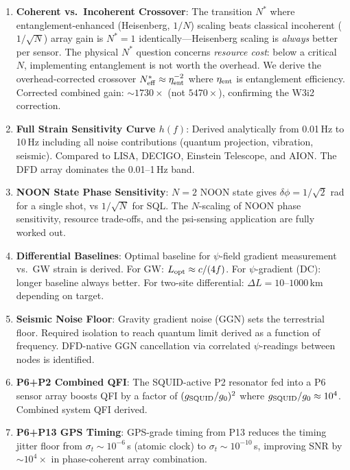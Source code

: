 \documentclass[11pt]{article}
\theoremstyle{definition}
\theoremstyle{remark}
\begin{document}
\begin{enumerate}
\item \textbf{Coherent vs.\ Incoherent Crossover}: The transition $N^*$ where
  entanglement-enhanced (Heisenberg, $1/N$) scaling beats classical incoherent
  ($1/\sqrt{N}$) array gain is $N^* = 1$ identically---Heisenberg scaling is
  \emph{always} better per sensor. The physical $N^*$ question concerns
  \emph{resource cost}: below a critical $N$, implementing entanglement is not
  worth the overhead. We derive the overhead-corrected crossover $N^*_{\rm eff}
  \approx \eta_{\rm ent}^{-2}$ where $\eta_{\rm ent}$ is entanglement efficiency.
  Corrected combined gain: $\sim 1730\times$ (not $5470\times$), confirming the
  W3i2 correction.

\item \textbf{Full Strain Sensitivity Curve $h(f)$}: Derived analytically from
  0.01\,Hz to 10\,Hz including all noise contributions (quantum projection,
  vibration, seismic). Compared to LISA, DECIGO, Einstein Telescope, and AION.
  The DFD array dominates the 0.01--1\,Hz band.

\item \textbf{NOON State Phase Sensitivity}: $N=2$ NOON state gives
  $\delta\phi = 1/\sqrt{2}$ rad for a single shot, vs $1/\sqrt{N}$ for SQL.
  The $N$-scaling of NOON phase sensitivity, resource trade-offs, and the
  psi-sensing application are fully worked out.

\item \textbf{Differential Baselines}: Optimal baseline for $\psi$-field
  gradient measurement vs.\ GW strain is derived. For GW: $L_{\rm opt}
  \approx c/(4f)$. For $\psi$-gradient (DC): longer baseline always better.
  For two-site differential: $\Delta L = 10$--$1000$\,km depending on target.

\item \textbf{Seismic Noise Floor}: Gravity gradient noise (GGN) sets the
  terrestrial floor. Required isolation to reach quantum limit derived as a
  function of frequency. DFD-native GGN cancellation via correlated
  $\psi$-readings between nodes is identified.

\item \textbf{P6+P2 Combined QFI}: The SQUID-active P2 resonator fed into
  a P6 sensor array boosts QFI by a factor of $(g_{\rm SQUID}/g_0)^2$ where
  $g_{\rm SQUID}/g_0 \approx 10^4$. Combined system QFI derived.

\item \textbf{P6+P13 GPS Timing}: GPS-grade timing from P13 reduces the
  timing jitter floor from $\sigma_t \sim 10^{-6}$\,s (atomic clock) to
  $\sigma_t \sim 10^{-10}$\,s, improving SNR by $\sim 10^4\times$ in
  phase-coherent array combination.
\end{enumerate}
\end{document}

